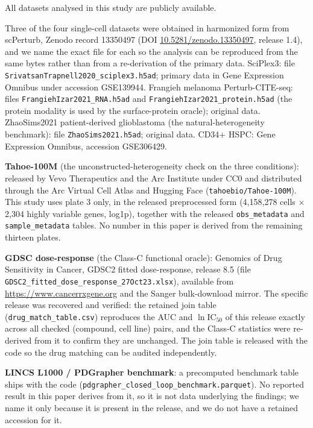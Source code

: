 \documentclass[11pt,letterpaper]{article}
\begin{document}
All datasets analysed in this study are publicly available.

Three of the four single-cell datasets were obtained in harmonized form from
scPerturb\cite{ref3}, Zenodo record 13350497 (DOI
\href{https://doi.org/10.5281/zenodo.13350497}{10.5281/zenodo.13350497}, release 1.4), and we name
the exact file for each so the analysis can be reproduced from the same bytes rather than from a
re-derivation of the primary data. SciPlex3: file
\texttt{SrivatsanTrapnell2020\_sciplex3.h5ad}; primary data in Gene Expression Omnibus under
accession GSE139944\cite{dataSciPlex3}. Frangieh melanoma Perturb-CITE-seq: files
\texttt{FrangiehIzar2021\_RNA.h5ad} and \texttt{FrangiehIzar2021\_protein.h5ad} (the protein
modality is used by the surface-protein oracle); original data\cite{dataFrangieh}.
ZhaoSims2021 patient-derived glioblastoma (the natural-heterogeneity benchmark): file
\texttt{ZhaoSims2021.h5ad}; original data\cite{dataZhao}. CD34$+$ HSPC: Gene Expression
Omnibus, accession GSE306429.

\textbf{Tahoe-100M} (the unconstructed-heterogeneity check on the three conditions): released by
Vevo Therapeutics and the Arc Institute under CC0 and distributed through the Arc Virtual Cell
Atlas and Hugging Face (\texttt{tahoebio/Tahoe-100M})\cite{Tahoe100M}. This study uses plate 3
only, in the released preprocessed form (4,158,278 cells $\times$ 2,304 highly variable genes,
log1p), together with the released \texttt{obs\_metadata} and \texttt{sample\_metadata} tables.
No number in this paper is derived from the remaining thirteen plates.

\textbf{GDSC dose-response} (the Class-C functional oracle): Genomics of Drug Sensitivity in
Cancer, GDSC2 fitted dose-response, release 8.5 (file
\texttt{GDSC2\_fitted\_dose\_response\_27Oct23.xlsx}), available from
\url{https://www.cancerrxgene.org} and the Sanger bulk-download mirror. The specific release was
recovered and verified: the retained join table (\texttt{drug\_match\_table.csv}) reproduces the
AUC and $\ln \mathrm{IC}_{50}$ of this release exactly across all checked (compound, cell line)
pairs, and the Class-C statistics were re-derived from it to confirm they are unchanged. The join
table is released with the code so the drug matching can be audited independently.

\textbf{LINCS L1000 / PDGrapher benchmark}: a precomputed benchmark table ships with the code
(\texttt{pdgrapher\_closed\_loop\_benchmark.parquet}). No reported result in this paper derives
from it, so it is not data underlying the findings; we name it only because it is present in the
release, and we do not have a retained accession for it.
\end{document}
